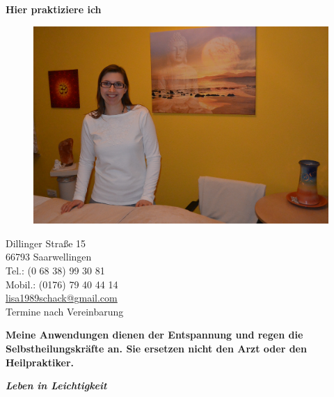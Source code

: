 \documentclass[10pt,foldmark,notumble]{leaflet}
\begin{document}
\newpage
\vspace*{15mm}
\centerline {\LARGE {\bf {Hier praktiziere ich}}}

\vspace*{28mm}
\begin{figure}[h]
\includegraphics [scale=.13]{Bild_Zimmer_Lisa3.jpg}
\end{figure}

\vspace*{13mm}
\begin{flushleft}
Dillinger Straße 15\\
66793 Saarwellingen\\
Tel.: (0 68 38) 99 30 81\\
Mobil.: (0176) 79 40 44 14\\
\href{mailto:lisa1989schack@gmail.com}{lisa1989schack@gmail.com} \\
\vspace{3mm}
\large{Termine nach Vereinbarung} 
\end{flushleft}
\vspace{3mm}
{\bf Meine Anwendungen dienen der Entspannung und \mbox{regen} die Selbstheilungskräfte an. Sie ersetzen nicht den Arzt oder den Heilpraktiker. }


\newpage
\vspace*{15mm}

\centerline {\Huge {\bf \it {Leben in Leichtigkeit}}}
\end{document}
